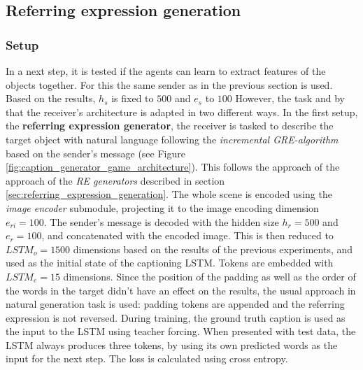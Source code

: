 \subsection{Referring expression generation}
\label{sec:referring-expression-generation-game}
\subsubsection*{Setup}

In a next step, it is tested if the agents can learn to extract features of the objects together.
For this the same sender as in the previous section is used.
Based on the results, $h_s$ is fixed to $500$ and $e_s$ to $100$
However, the task and by that the receiver's architecture is adapted in two different ways.
In the first setup, the \textbf{referring expression generator}, the receiver is tasked to describe the target object with natural language following the \emph{incremental GRE-algorithm} based on the sender's message (see Figure \ref{fig:caption_generator_game_architecture}).
This follows the approach of the approach of the \emph{RE generators} described in section \ref{sec:referring_expression_generation}.
The whole scene is encoded using the \emph{image encoder} submodule, projecting it to the image encoding dimension $e_{ri}=100$.
The sender's message is decoded with the hidden size $h_r=500$ and $e_r=100$, and concatenated with the encoded image.
This is then reduced to $LSTM_o=1500$ dimensions based on the results of the previous experiments, and used as the initial state of the captioning LSTM.
Tokens are embedded with $LSTM_e=15$ dimensions.
Since the position of the padding as well as the order of the words in the target didn't have an effect on the results, the usual approach in natural generation task is used: padding tokens are appended and the referring expression is not reversed.
During training, the ground truth caption is used as the input to the LSTM using teacher forcing.
When presented with test data, the LSTM always produces three tokens, by using its own predicted words as the input for the next step.
The loss is calculated using cross entropy.

